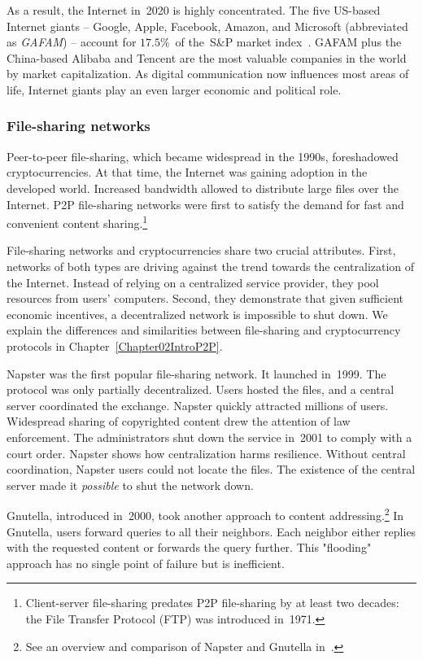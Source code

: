As a result, the Internet in~2020 is highly concentrated.
The five US-based Internet giants -- Google, Apple, Facebook, Amazon, and Microsoft (abbreviated as \textit{GAFAM}) -- account for $17.5\%$~of the~S\&P market index~\cite{Levy2020}.
GAFAM plus the China-based Alibaba and Tencent are the most valuable companies in the world by market capitalization.
As digital communication now influences most areas of life, Internet giants play an even larger economic and political role.


\subsubsection*{File-sharing networks}
\label{sec:FileSharingNetworks}

Peer-to-peer file-sharing, which became widespread in the 1990s, foreshadowed cryptocurrencies.
At that time, the Internet was gaining adoption in the developed world.
Increased bandwidth allowed to distribute large files over the Internet.
P2P file-sharing networks were first to satisfy the demand for fast and convenient content sharing.\footnote{Client-server file-sharing predates P2P file-sharing by at least two decades: the File Transfer Protocol (FTP) was introduced in~1971.}

File-sharing networks and cryptocurrencies share two crucial attributes.
First, networks of both types are driving against the trend towards the centralization of the Internet.
Instead of relying on a centralized service provider, they pool resources from users' computers.
Second, they demonstrate that given sufficient economic incentives, a decentralized network is impossible to shut down.
We explain the differences and similarities between file-sharing and cryptocurrency protocols in Chapter~\ref{Chapter02IntroP2P}.

Napster was the first popular file-sharing network.
It launched in~1999.
The protocol was only partially decentralized.
Users hosted the files, and a central server coordinated the exchange.
Napster quickly attracted millions of users.
Widespread sharing of copyrighted content drew the attention of law enforcement.
The administrators shut down the service in~2001 to comply with a court order.
Napster shows how centralization harms resilience.
Without central coordination, Napster users could not locate the files.
The existence of the central server made it \textit{possible} to shut the network down.

Gnutella, introduced in~2000, took another approach to content addressing.\footnote{See an overview and comparison of Napster and Gnutella in~\cite{Saroiu2003}.}
In Gnutella, users forward queries to all their neighbors.
Each neighbor either replies with the requested content or forwards the query further.
This "flooding" approach has no single point of failure but is inefficient.

